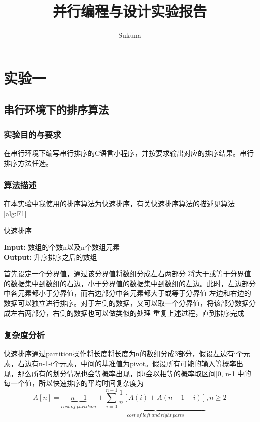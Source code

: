 \documentclass[supercite]{Experimental_Report}
\title{并行编程与设计实验报告}
\author{Sukuna}
\theoremstyle{definition}
\begin{document}
\maketitle
\clearpage


\tableofcontents[level=2]
\clearpage

\section{实验一}
\subsection{串行环境下的排序算法}
\subsubsection{实验目的与要求}

在串行环境下编写串行排序的C语言小程序，并按要求输出对应的排序结果。串行排序方法任选。

\subsubsection{算法描述}
在本实验中我使用的排序算法为快速排序，有关快速排序算法的描述见算法\ref{alg:F1}
\begin{algorithm}[htb]
\caption{快速排序}
\label{alg:F1}
\hspace*{0.02in} {\bf Input:}
数组的个数n以及n个数组元素\\
\hspace*{0.02in} {\bf Output:} 
升序排序之后的数组
\begin{algorithmic}[1] 
\State 首先设定一个分界值，通过该分界值将数组分成左右两部分
\State 将大于或等于分界值的数据集中到数组的右边，小于分界值的数据集中到数组的左边。此时，左边部分中各元素都小于分界值，而右边部分中各元素都大于或等于分界值
\State 左边和右边的数据可以独立进行排序。对于左侧的数据，又可以取一个分界值，将该部分数据分成左右两部分，右侧的数据也可以做类似的处理
\State 重复上述过程，直到排序完成
\end{algorithmic}
\end{algorithm}

\subsubsection{复杂度分析}
快速排序通过partition操作将长度将长度为n的数组分成3部分，假设左边有i个元素，右边有n-1-i个元素，中间的基准值为pivot。假设所有可能的输入等概率出现，那么所有的划分情况也会等概率出现，即i会以相等的概率取区间[0, n-1]中的每一个值，所以快速排序的平均时间复杂度为
$$ A[n] = \underbrace{n-1}_{cost \ of \ partition}+\underbrace{\sum_{i = 0}^{n-1}\frac{1}{n}[A(i) + A(n-1-i)]}_{cost \ of \ left \ and \ right \ parts},n \ge 2 $$
\end{document}

